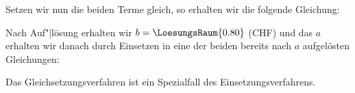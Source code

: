 \vspace{22mm}

Setzen wir nun die beiden Terme gleich, so erhalten wir die
folgende Gleichung:


Nach Auf"|lösung erhalten wir $b=\LoesungsRaum{0.80}$ (CHF) und das
$a$ erhalten wir danach durch Einsetzen in eine der beiden bereits
nach $a$ aufgelösten Gleichungen:

Das Gleichsetzungsverfahren ist ein Spezialfall des
Einsetzungsverfahrens.
\newpage



\newpage

\TALS{
\newpage}

\TALS{
\newpage}


\newpage

\TALS{
\newpage}

\TALS{
\newpage}

\TALS{
\newpage}


\newpage
